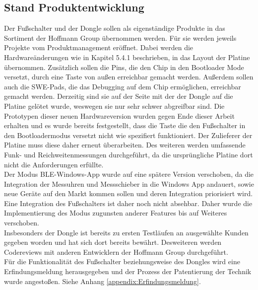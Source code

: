 \subsection{Stand Produktentwicklung}
Der Fußschalter und der Dongle sollen als eigenständige Produkte in das Sortiment der Hoffmann Group übernommen werden. Für sie werden jeweils Projekte vom Produktmanagement eröffnet. Dabei werden die Hardwareänderungen wie in Kapitel 5.4.1 beschrieben, in das Layout der Platine übernommen. Zusätzlich sollen die Pins, die den Chip in den Bootloader Mode versetzt, durch eine Taste von außen erreichbar gemacht werden. Außerdem sollen auch die SWE-Pads, die das Debugging auf dem Chip ermöglichen, erreichbar gemacht werden. Derzeitig sind sie auf der Seite mit der der Dongle auf die Platine gelötet wurde, weswegen sie nur sehr schwer abgreifbar sind. Die Prototypen dieser neuen Hardwareversion wurden gegen Ende dieser Arbeit erhalten und es wurde bereits festgestellt, dass die Taste die den Fußschalter in den Bootloadermodus versetzt nicht wie spezifiert funktioniert. Der Zulieferer der Platine muss diese daher erneut überarbeiten. Des weiteren werden umfassende Funk- und Reichweitenmessungen durchgeführt, da die ursprüngliche Platine dort nicht die Anforderungen erfüllte.\\
Der Modus \ac{BLE}-Windows-App wurde auf eine spätere Version verschoben, da die Integration der Messuhren und Messschieber in die Windows App andauert, sowie neue Geräte auf den Markt kommen sollen und deren Integration priorisiert wird. Eine Integration des Fußschalters ist daher noch nicht absehbar. Daher wurde die Implementierung des Modus zugunsten anderer Features bis auf Weiteres verschoben.\\
Insbesonders der Dongle ist bereits zu ersten Testläufen an ausgewählte Kunden gegeben worden und hat sich dort bereits bewährt. Desweiteren werden Codereviews mit anderen Entwicklern der Hoffmann Group durchgeführt.\\
Für die Funktionalität des Fußschalter beziehungsweise des Dongles wird eine Erfindungsmeldung herausgegeben und der Prozess der Patentierung der Technik wurde angestoßen. Siehe Anhang \ref{appendix:Erfindungsmeldung}.
